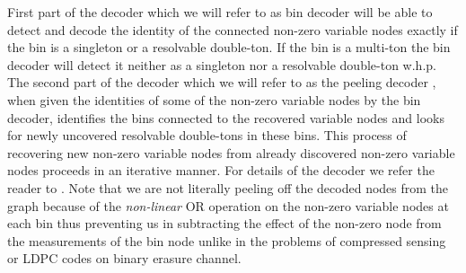\documentclass[conference,twocolumn]{IEEEtran}
\begin{document}
{First part of the decoder which we will refer to as bin decoder will be able to detect and decode the identity of the connected non-zero variable nodes exactly if the bin is a singleton or a resolvable double-ton. If the bin is a multi-ton the bin decoder will detect it neither as a singleton nor a resolvable double-ton w.h.p. The second part of the decoder which we will refer to as the peeling decoder \cite{li2015subisit}, when given the identities of some of the non-zero variable nodes by the bin decoder, identifies the bins connected to the recovered variable nodes and looks for newly uncovered resolvable double-tons in these bins. This process of recovering new non-zero variable nodes from already discovered non-zero variable nodes proceeds in an iterative manner. For details of the decoder we refer the reader to \cite{lee2015saffron}. Note that we are not literally peeling off the decoded nodes from the graph because of the \textit{non-linear} OR operation on the non-zero variable nodes at each bin thus preventing us in subtracting the effect of the non-zero node from the measurements of the bin node unlike in the problems of compressed sensing or LDPC codes on binary erasure channel.

}
\end{document}

